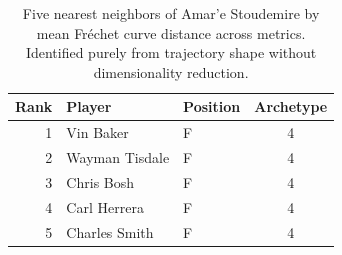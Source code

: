 \begin{table}[htbp]
  \centering\small
  \begin{tabular}{rllc}
    \toprule
    Rank & Player & Position & Archetype \\
    \midrule
    1 & Vin Baker & F & 4 \\
    2 & Wayman Tisdale & F & 4 \\
    3 & Chris Bosh & F & 4 \\
    4 & Carl Herrera & F & 4 \\
    5 & Charles Smith & F & 4 \\
    \bottomrule
  \end{tabular}
  \caption{Five nearest neighbors of Amar'e Stoudemire by mean Fr\'{e}chet curve distance across metrics. Identified purely from trajectory shape without dimensionality reduction.}
  \label{tab:Amar_e_Stoudemire_frechet_curve_neighbors}
\end{table}

